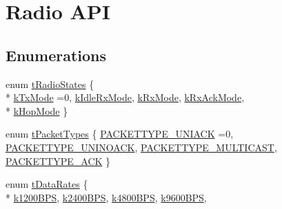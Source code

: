 \hypertarget{group___radio}{\section{Radio A\-P\-I}
\label{group___radio}
}
\subsection*{Enumerations}
\begin{DoxyCompactItemize}
\item 
enum \hyperlink{group___radio_gad2b6877d3d2c1164d3373dc9b98cab84}{t\-Radio\-States} \{ \\*
\hyperlink{group___radio_ggad2b6877d3d2c1164d3373dc9b98cab84a5271b78d0e7e16099e5569ac198b6d4c}{k\-Tx\-Mode} =0, 
\hyperlink{group___radio_ggad2b6877d3d2c1164d3373dc9b98cab84a10fa59809c02d95ab838667349b2d5f6}{k\-Idle\-Rx\-Mode}, 
\hyperlink{group___radio_ggad2b6877d3d2c1164d3373dc9b98cab84a5f73ccc433cbdf965d516c55c5a5c4ef}{k\-Rx\-Mode}, 
\hyperlink{group___radio_ggad2b6877d3d2c1164d3373dc9b98cab84a635358a3f25c30feb113eb976975a947}{k\-Rx\-Ack\-Mode}, 
\\*
\hyperlink{group___radio_ggad2b6877d3d2c1164d3373dc9b98cab84a8ac217adac9fd5fbd2fb77b836ecd5cb}{k\-Hop\-Mode}
 \}
\item 
enum \hyperlink{group___radio_gaba81c4c5fad7e2e0cef01f8e6c710ecb}{t\-Packet\-Types} \{ \hyperlink{group___radio_ggaba81c4c5fad7e2e0cef01f8e6c710ecba05720cb63d7daa7b80a60a8930396ca3}{P\-A\-C\-K\-E\-T\-T\-Y\-P\-E\-\_\-\-U\-N\-I\-A\-C\-K} =0, 
\hyperlink{group___radio_ggaba81c4c5fad7e2e0cef01f8e6c710ecba0671952773f4139f7909fc2ce2dda05a}{P\-A\-C\-K\-E\-T\-T\-Y\-P\-E\-\_\-\-U\-N\-I\-N\-O\-A\-C\-K}, 
\hyperlink{group___radio_ggaba81c4c5fad7e2e0cef01f8e6c710ecbab08634eadf8db8eb090dfec2a327d2b5}{P\-A\-C\-K\-E\-T\-T\-Y\-P\-E\-\_\-\-M\-U\-L\-T\-I\-C\-A\-S\-T}, 
\hyperlink{group___radio_ggaba81c4c5fad7e2e0cef01f8e6c710ecbacb072737fc8b959c9d08bccf3880a372}{P\-A\-C\-K\-E\-T\-T\-Y\-P\-E\-\_\-\-A\-C\-K}
 \}
\item 
enum \hyperlink{group___radio_ga8ca09000106eab66e7f5a4998107f805}{t\-Data\-Rates} \{ \\*
\hyperlink{group___radio_gga8ca09000106eab66e7f5a4998107f805a7e15671135d49305cdb4aad417786c18}{k1200\-B\-P\-S}, 
\hyperlink{group___radio_gga8ca09000106eab66e7f5a4998107f805adbbb374a9a080b76548af7683da68b29}{k2400\-B\-P\-S}, 
\hyperlink{group___radio_gga8ca09000106eab66e7f5a4998107f805a023ffe0b4bbe00860a2ed860922a937a}{k4800\-B\-P\-S}, 
\hyperlink{group___radio_gga8ca09000106eab66e7f5a4998107f805abf49e6adc1c2aad4dffd53d6be7379c5}{k9600\-B\-P\-S}, 

\end{DoxyCompactItemize}
